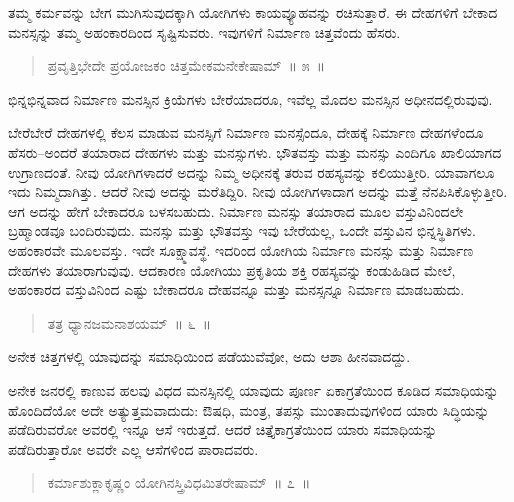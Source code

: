 ತಮ್ಮ ಕರ್ಮವನ್ನು ಬೇಗ ಮುಗಿಸುವುದಕ್ಕಾಗಿ ಯೋಗಿಗಳು ಕಾಯವ್ಯೂಹವನ್ನು ರಚಿಸುತ್ತಾರೆ. ಈ ದೇಹಗಳಿಗೆ ಬೇಕಾದ ಮನಸ್ಸನ್ನು ತಮ್ಮ ಅಹಂಕಾರದಿಂದ ಸೃಷ್ಟಿಸುವರು. ಇವುಗಳಿಗೆ ನಿರ್ಮಾಣ ಚಿತ್ತವೆಂದು ಹೆಸರು. 

\eject

\begin{verse}
ಪ್ರವೃತ್ತಿಭೇದೇ ಪ್ರಯೋಜಕಂ ಚಿತ್ತಮೇಕಮನೇಕೇಷಾಮ್​~॥ ೫~॥
\end{verse}

\vspace{-0.3cm}

ಭಿನ್ನಭಿನ್ನವಾದ ನಿರ್ಮಾಣ ಮನಸ್ಸಿನ ಕ್ರಿಯೆಗಳು ಬೇರೆಯಾದರೂ, ಇವೆಲ್ಲ ಮೊದಲ ಮನಸ್ಸಿನ ಅಧೀನದಲ್ಲಿರುವುವು. 

ಬೇರೆಬೇರೆ ದೇಹಗಳಲ್ಲಿ ಕೆಲಸ ಮಾಡುವ ಮನಸ್ಸಿಗೆ ನಿರ್ಮಾಣ ಮನಸ್ಸೆಂದೂ, ದೇಹಕ್ಕೆ ನಿರ್ಮಾಣ ದೇಹಗಳೆಂದೂ ಹೆಸರು–ಅಂದರೆ ತಯಾರಾದ ದೇಹಗಳು ಮತ್ತು ಮನಸ್ಸುಗಳು. ಭೌತವಸ್ತು ಮತ್ತು ಮನಸ್ಸು ಎಂದಿಗೂ ಖಾಲಿಯಾಗದ ಉಗ್ರಾಣದಂತೆ. ನೀವು ಯೋಗಿಗಳಾದರೆ ಅದನ್ನು ನಿಮ್ಮ ಅಧೀನಕ್ಕೆ ತರುವ ರಹಸ್ಯವನ್ನು ಕಲಿಯುತ್ತೀರಿ. ಯಾವಾಗಲೂ ಇದು ನಿಮ್ಮದಾಗಿತ್ತು. ಆದರೆ ನೀವು ಅದನ್ನು ಮರೆತಿದ್ದಿರಿ. ನೀವು ಯೋಗಿಗಳಾದಾಗ ಅದನ್ನು ಮತ್ತೆ ನೆನಪಿಸಿಕೊಳ್ಳುತ್ತೀರಿ. ಆಗ ಅದನ್ನು ಹೇಗೆ ಬೇಕಾದರೂ ಬಳಸಬಹುದು. ನಿರ್ಮಾಣ ಮನಸ್ಸು ತಯಾರಾದ ಮೂಲ ವಸ್ತುವಿನಿಂದಲೇ ಬ್ರಹ್ಮಾಂಡವೂ  ಬಂದಿರುವುದು. ಮನಸ್ಸು ಮತ್ತು ಭೌತವಸ್ತು ಇವು ಬೇರೆಯಲ್ಲ, ಒಂದೇ ವಸ್ತುವಿನ ಭಿನ್ನಸ್ಥಿತಿಗಳು. ಅಹಂಕಾರವೇ ಮೂಲವಸ್ತು. ಇದೇ ಸೂಕ್ಷ್ಮಾವಸ್ಥೆ. ಇದರಿಂದ ಯೋಗಿಯ ನಿರ್ಮಾಣ ಮನಸ್ಸು ಮತ್ತು ನಿರ್ಮಾಣ ದೇಹಗಳು ತಯಾರಾಗುವುವು. ಆದಕಾರಣ ಯೋಗಿಯು ಪ್ರಕೃತಿಯ ಶಕ್ತಿ ರಹಸ್ಯವನ್ನು ಕಂಡುಹಿಡಿದ ಮೇಲೆ, ಅಹಂಕಾರದ ವಸ್ತುವಿನಿಂದ ಎಷ್ಟು ಬೇಕಾದರೂ ದೇಹವನ್ನೂ ಮತ್ತು ಮನಸ್ಸನ್ನೂ ನಿರ್ಮಾಣ ಮಾಡಬಹುದು. 

\vspace{-0.3cm}

\begin{verse}
ತತ್ರ ಧ್ಯಾನಜಮನಾಶಯಮ್​~॥ ೬~॥
\end{verse}

\vspace{-0.3cm}

ಅನೇಕ ಚಿತ್ತಗಳಲ್ಲಿ ಯಾವುದನ್ನು ಸಮಾಧಿಯಿಂದ ಪಡೆಯುವೆವೋ, ಅದು ಆಶಾ ಹೀನವಾದದ್ದು. 

ಅನೇಕ ಜನರಲ್ಲಿ ಕಾಣುವ ಹಲವು ವಿಧದ ಮನಸ್ಸಿನಲ್ಲಿ ಯಾವುದು ಪೂರ್ಣ ಏಕಾಗ್ರತೆಯಿಂದ ಕೂಡಿದ ಸಮಾಧಿಯನ್ನು ಹೊಂದಿದೆಯೋ ಅದೇ ಅತ್ಯುತ್ತಮವಾದುದು: ಔಷಧಿ, ಮಂತ್ರ, ತಪಸ್ಸು ಮುಂತಾದುವುಗಳಿಂದ ಯಾರು ಸಿದ್ಧಿಯನ್ನು ಪಡೆದಿರುವರೋ ಅವರಲ್ಲಿ ಇನ್ನೂ ಆಸೆ ಇರುತ್ತದೆ. ಆದರೆ ಚಿತ್ತೈಕಾಗ್ರತೆಯಿಂದ ಯಾರು ಸಮಾಧಿಯನ್ನು ಪಡೆದಿರುತ್ತಾರೋ ಅವರೇ ಎಲ್ಲ ಆಸೆಗಳಿಂದ ಪಾರಾದವರು. 


\begin{verse}
ಕರ್ಮಾಶುಕ್ಲಾಕೃಷ್ಣಂ ಯೋಗಿನಸ್ತ್ರಿವಿಧಮಿತರೇಷಾಮ್​~॥ ೭~॥
\end{verse}


